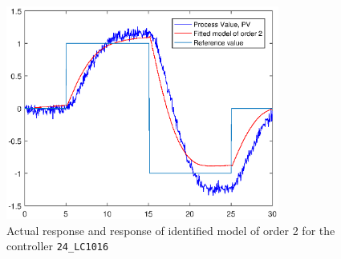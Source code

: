 \begin{figure}[ht!]
	\centering
	\includegraphics[width=0.8\textwidth]{fig/identification/lc1016_order2_ref.eps}
	\caption{Actual response and response of identified model of order 2 for the controller \texttt{24\_LC1016}}
	\label{fig:lc1016_identified}
\end{figure}